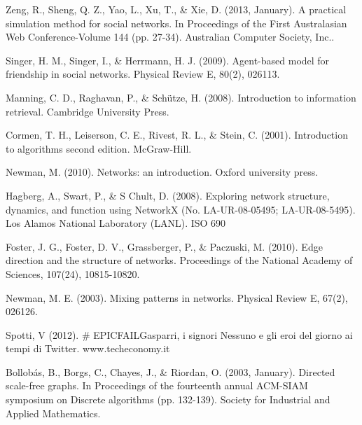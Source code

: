 \documentclass[a4paper,12pt]{article}
\begin{document}
\begin{thebibliography}{9}
  Zeng, R., Sheng, Q. Z., Yao, L., Xu, T., \& Xie, D. (2013, January). A practical simulation method for social networks. In Proceedings of the First Australasian Web Conference-Volume 144 (pp. 27-34). Australian Computer Society, Inc..
  
  Singer, H. M., Singer, I., \& Herrmann, H. J. (2009). Agent-based model for friendship in social networks. Physical Review E, 80(2), 026113.

  Manning, C. D., Raghavan, P., \& Schütze, H. (2008). Introduction to information retrieval. Cambridge University Press.
  
  Cormen, T. H., Leiserson, C. E., Rivest, R. L., \& Stein, C. (2001). Introduction to algorithms second edition. McGraw-Hill.
  
  Newman, M. (2010). Networks: an introduction. Oxford university press.
  
  Hagberg, A., Swart, P., \& S Chult, D. (2008). Exploring network structure, dynamics, and function using NetworkX (No. LA-UR-08-05495; LA-UR-08-5495). Los Alamos National Laboratory (LANL).
ISO 690	

  Foster, J. G., Foster, D. V., Grassberger, P., \& Paczuski, M. (2010). Edge direction and the structure of networks. Proceedings of the National Academy of Sciences, 107(24), 10815-10820.
  
  Newman, M. E. (2003). Mixing patterns in networks. Physical Review E, 67(2), 026126.
  
  Spotti, V (2012). \# EPICFAILGasparri, i signori Nessuno e gli eroi del giorno ai tempi di Twitter. www.techeconomy.it
  
  Bollobás, B., Borgs, C., Chayes, J., \& Riordan, O. (2003, January). Directed scale-free graphs. In Proceedings of the fourteenth annual ACM-SIAM symposium on Discrete algorithms (pp. 132-139). Society for Industrial and Applied Mathematics.
\end{thebibliography}
\end{document}
